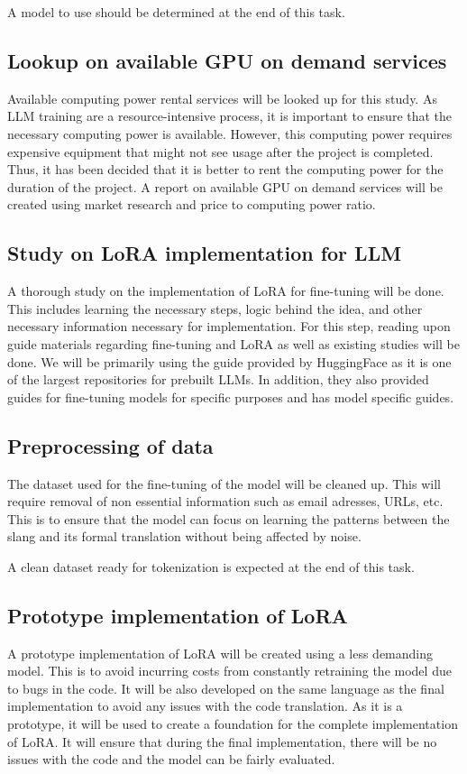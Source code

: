 A model to use should be determined at the end of this task.

\subsection{Lookup on available GPU on demand services} 
Available computing power rental services will be looked up for this study.
As LLM training are a resource-intensive process, it is important to ensure that the necessary computing power is available.
However, this computing power requires expensive equipment that might not see usage after the project is completed.
Thus, it has been decided that it is better to rent the computing power for the duration of the project.
A report on available GPU on demand services will be created using market research and price to computing power ratio.

\subsection{Study on LoRA implementation for LLM}
A thorough study on the implementation of LoRA for fine-tuning will be done.
This includes learning the necessary steps, logic behind the idea, and other necessary information necessary for implementation.
For this step, reading upon guide materials regarding fine-tuning and LoRA as well as existing studies will be done.
We will be primarily using the guide provided by HuggingFace as it is one of the largest repositories for prebuilt LLMs.
In addition, they also provided guides for fine-tuning models for specific purposes and has model specific guides.

\subsection{Preprocessing of data} 
The dataset used for the fine-tuning of the model will be cleaned up.
This will require removal of non essential information such as email adresses, URLs, etc.
This is to ensure that the model can focus on learning the patterns between the slang and its formal translation without being affected by noise.

A clean dataset ready for tokenization is expected at the end of this task.

\subsection{Prototype implementation of LoRA}
A prototype implementation of LoRA will be created using a less demanding model.
This is to avoid incurring costs from constantly retraining the model due to bugs in the code.
It will be also developed on the same language as the final implementation to avoid any issues with the code translation.
As it is a prototype, it will be used to create a foundation for the complete implementation of LoRA.
It will ensure that during the final implementation, there will be no issues with the code and the model can be fairly evaluated.


